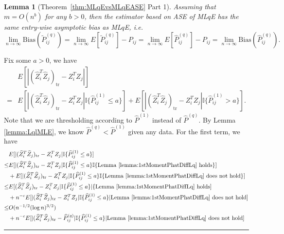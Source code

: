 \documentclass[a4paper]{article}
\newenvironment{proof}{{\bf Proof:  }}{\hfill\rule{2mm}{2mm}}
\newtheorem{lemma}[fact]{Lemma}
\renewcommand{\hat}{\widehat}
\begin{document}
\begin{lemma}[Theorem~\ref{thm:MLqEvsMLqEASE} Part 1]
\label{lm:LqConsistentproof}
Assuming that $m = O(n^b)$ for any $b > 0$, then the estimator based on ASE of ML$q$E has the same entry-wise asymptotic bias as ML$q$E, i.e.
\[
	\lim_{n \to \infty} \mathrm{Bias}(\widetilde{P}_{ij}^{(q)}) = \lim_{n \to \infty} E[\widetilde{P}_{ij}^{(q)}] - P_{ij} = \lim_{n \to \infty} E[\hat{P}^{(q)}_{ij}] - P_{ij}
    = \lim_{n \to \infty} \mathrm{Bias}(\hat{P}_{ij}^{(q)}).
\]
\end{lemma}
\begin{proof}
Fix some $a > 0$, we have
\begin{align*}
	& E[|(\hat{Z}_i^T \hat{Z}_j)_{\mathrm{tr}} - Z_i^T Z_j|] \\
	= & E[|(\hat{Z}_i^T \hat{Z}_j)_{\mathrm{tr}} - Z_i^T Z_j| \mathbb{I}\{\hat{P}^{(1)}_{ij} \le a\}]
	+ E[|(\hat{Z}_i^T \hat{Z}_j)_{\mathrm{tr}} - Z_i^T Z_j| \mathbb{I}\{\hat{P}^{(1)}_{ij} > a\}].
\end{align*}
Note that we are thresholding according to $\hat{P}^{(1)}$ instead of $\hat{P}^{(q)}$. By Lemma \ref{lemma:LqlMLE}, we know $\hat{P}^{(q)} < \hat{P}^{(1)}$ given any data.
For the first term, we have
\begin{align*}
	& E[|(\hat{Z}_i^T \hat{Z}_j)_{\mathrm{tr}} - Z_i^T Z_j| \mathbb{I}\{\hat{P}^{(1)}_{ij} \le a\}] \\
	\le & E[|(\hat{Z}_i^T \hat{Z}_j)_{\mathrm{tr}} - Z_i^T Z_j| \mathbb{I}\{\hat{P}^{(1)}_{ij} \le a\} \mathbb{I}\{\mathrm{Lemma\ } \ref{lemma:1stMomentPhatDiffLq} \mathrm{\ holds}\}] \\
	& + E[|(\hat{Z}_i^T \hat{Z}_j)_{\mathrm{tr}} - Z_i^T Z_j| \mathbb{I}\{\hat{P}^{(1)}_{ij} \le a\} \mathbb{I}\{\mathrm{Lemma\ } \ref{lemma:1stMomentPhatDiffLq} \mathrm{\ does\ not\ hold}\}] \\
	\le & E[(\hat{Z}_i^T \hat{Z}_j)_{\mathrm{tr}} - Z_i^T Z_j| \mathbb{I}\{\hat{P}^{(1)}_{ij} \le a\} |\{\mathrm{Lemma\ } \ref{lemma:1stMomentPhatDiffLq} \mathrm{\ holds}] \\
	& + n^{-c} E[|(\hat{Z}_i^T \hat{Z}_j)_{\mathrm{tr}} - Z_i^T Z_j| \mathbb{I}\{\hat{P}^{(1)}_{ij} \le a\} | \mathrm{Lemma\ } \ref{lemma:1stMomentPhatDiffLq} \mathrm{\ does\ not\ hold}] \\
	\le & O(n^{-1/2} (\log n)^{3/2}) \\
	& + n^{-c} E[|(\hat{Z}_i^T \hat{Z}_j)_{\mathrm{tr}} - \hat{P}^{(q)}_{ij}| \mathbb{I}\{\hat{P}^{(1)}_{ij} \le a\} | \mathrm{Lemma\ } \ref{lemma:1stMomentPhatDiffLq} \mathrm{\ does\ not\ hold}] \\

\end{align*}
\end{proof}
\end{document}
